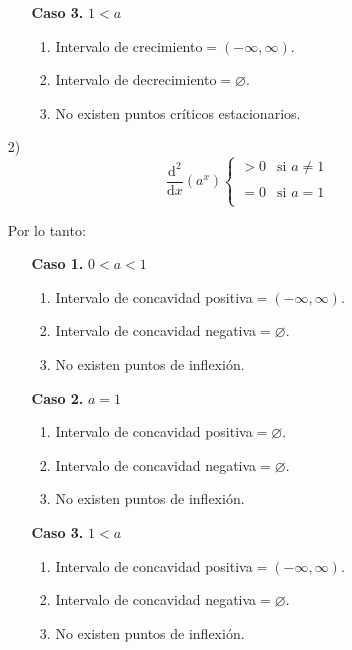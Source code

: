 \documentclass{article}
\numberwithin{equation}{section}
\begin{document}
\begin{enumerate}
\begin{enumerate}
    \item[\textbf{Caso 3.}]  $1<a$
    \begin{enumerate}
    \item Intervalo de crecimiento$=(-\infty,\infty)$.
    \item Intervalo de decrecimiento$=\varnothing$.
    \item No existen puntos críticos estacionarios.
    \end{enumerate} 
    
    \end{enumerate}
    
    \item[2)] $$ \frac{\mathrm{d^2}}{\mathrm{d}x} \left(  {a^x}  \right)  
    \left\{
        \begin{array}{ll}
            >0  & \mbox{si } a\neq 1 \\
            \\ =0 & \mbox{si } a=1 \\
        \end{array}
    \right.$$
    
    Por lo tanto:
    
    \begin{enumerate}
    
    \item[\textbf{Caso 1.}]  $0<a<1$
    \begin{enumerate}
    \item Intervalo de concavidad positiva$=(-\infty,\infty)$.
    \item Intervalo de concavidad negativa$=\varnothing$.
    \item No existen puntos de inflexión.
    \end{enumerate} 
    
    \item[\textbf{Caso 2.}]  $a=1$
    \begin{enumerate}
    \item Intervalo de concavidad positiva$=\varnothing$.
    \item Intervalo de concavidad negativa$=\varnothing$.
    \item No existen puntos de inflexión.
    \end{enumerate} 
    
    \item[\textbf{Caso 3.}]  $1<a$
    \begin{enumerate}
    \item Intervalo de concavidad positiva$=(-\infty,\infty)$.
    \item Intervalo de concavidad negativa$=\varnothing$.
    \item No existen puntos de inflexión.
    \end{enumerate} 
    

\end{enumerate}
\end{enumerate}
\end{document}
